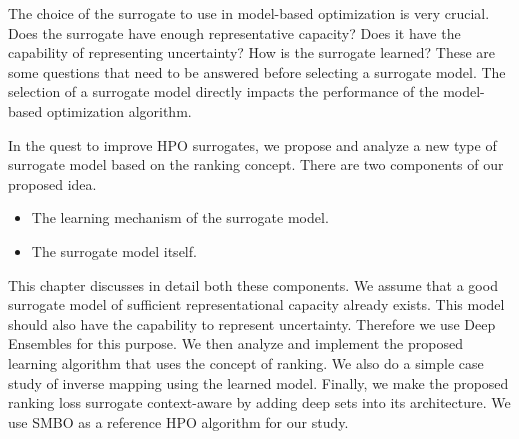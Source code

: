 \documentclass[12pt, twoside, ngerman]{report}
\begin{document}

The choice of the surrogate to use in model-based optimization is very crucial.
Does the surrogate have enough representative capacity?
Does it have the capability of representing uncertainty?
How is the surrogate learned?
These are some questions that need to be answered before selecting a surrogate model.
The selection of a surrogate model directly impacts the performance of the model-based optimization algorithm.

In the quest to improve HPO surrogates,  we propose and analyze a new type of surrogate model based on the ranking concept.
There are two components of our proposed idea.

\begin{itemize}
\item The learning mechanism of the surrogate model.
\item The surrogate model itself.
\end{itemize}

This chapter discusses in detail both these components.
We assume that a good surrogate model of sufficient representational capacity already exists.
This model should also have the capability to represent uncertainty.
Therefore we use Deep Ensembles for this purpose.
We then analyze and implement the proposed learning algorithm that uses the concept of ranking.
We also do a simple case study of inverse mapping using the learned model.
Finally, we make the proposed ranking loss surrogate context-aware by adding deep sets into its architecture.
We use SMBO as a reference HPO algorithm for our study.
\end{document}
